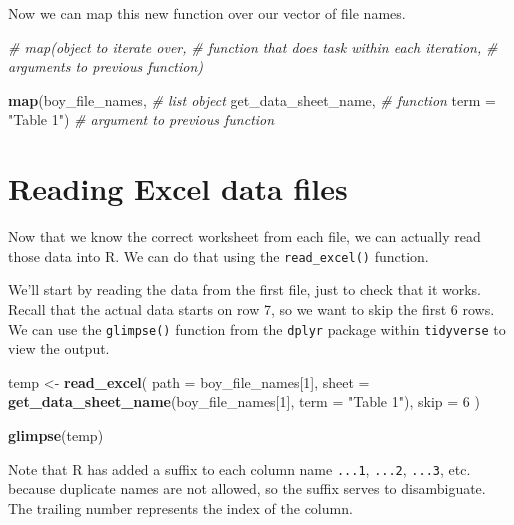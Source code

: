 \documentclass[
]{book}
\newenvironment{Shaded}{\begin{snugshade}}{\end{snugshade}}
\newcommand{\CommentTok}[1]{\textcolor[rgb]{0.56,0.35,0.01}{\textit{#1}}}
\newcommand{\DataTypeTok}[1]{\textcolor[rgb]{0.13,0.29,0.53}{#1}}
\newcommand{\DecValTok}[1]{\textcolor[rgb]{0.00,0.00,0.81}{#1}}
\newcommand{\KeywordTok}[1]{\textcolor[rgb]{0.13,0.29,0.53}{\textbf{#1}}}
\newcommand{\NormalTok}[1]{#1}
\newcommand{\StringTok}[1]{\textcolor[rgb]{0.31,0.60,0.02}{#1}}
\begin{document}
Now we can map this new function over our vector of file names.

\begin{Shaded}
\begin{Highlighting}[]
\CommentTok{# map(object to iterate over, }
\CommentTok{#     function that does task within each iteration, }
\CommentTok{#     arguments to previous function)}
 
\KeywordTok{map}\NormalTok{(boy_file_names,      }\CommentTok{# list object}
\NormalTok{    get_data_sheet_name, }\CommentTok{# function}
    \DataTypeTok{term =} \StringTok{"Table 1"}\NormalTok{)    }\CommentTok{# argument to previous function}
\end{Highlighting}
\end{Shaded}

\hypertarget{reading-excel-data-files}{%
\section{Reading Excel data files}\label{reading-excel-data-files}}

Now that we know the correct worksheet from each file, we can actually
read those data into R. We can do that using the \texttt{read\_excel()} function.

We'll start by reading the data from the first file, just to check
that it works. Recall that the actual data starts on row 7, so we want
to skip the first 6 rows. We can use the \texttt{glimpse()} function from
the \texttt{dplyr} package within \texttt{tidyverse} to view the output.

\begin{Shaded}
\begin{Highlighting}[]
\NormalTok{temp <-}\StringTok{ }\KeywordTok{read_excel}\NormalTok{(}
  \DataTypeTok{path =}\NormalTok{ boy_file_names[}\DecValTok{1}\NormalTok{],}
  \DataTypeTok{sheet =} \KeywordTok{get_data_sheet_name}\NormalTok{(boy_file_names[}\DecValTok{1}\NormalTok{], }\DataTypeTok{term =} \StringTok{"Table 1"}\NormalTok{),}
  \DataTypeTok{skip =} \DecValTok{6}
\NormalTok{)}

\KeywordTok{glimpse}\NormalTok{(temp)}
\end{Highlighting}
\end{Shaded}

Note that R has added a suffix to each column name \texttt{...1}, \texttt{...2},
\texttt{...3}, etc. because duplicate names are not allowed, so the suffix serves
to disambiguate. The trailing number represents the index of the column.
\end{document}
